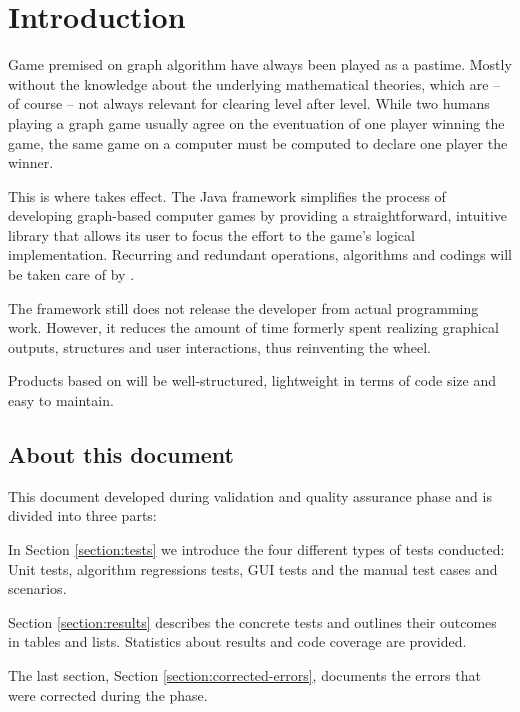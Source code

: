 \section{Introduction}
Game premised on graph algorithm have always been played as a pastime. Mostly without the knowledge about the underlying mathematical theories, which are -- of course -- not always relevant for clearing level after level. While two humans playing a graph game usually agree on the eventuation of one player winning the game, the same game on a computer must be computed to declare one player the winner.\par

This is where \graphioli takes effect. The Java framework simplifies the process of developing graph-based computer games by providing a straightforward, intuitive library that allows its user to focus the effort to the game's logical implementation. Recurring and redundant operations, algorithms and codings will be taken care of by \graphioli.\par

The framework still does not release the developer from actual programming work. However, it reduces the amount of time formerly spent realizing graphical outputs, structures and user interactions, thus reinventing the wheel.\par

Products based on \graphioli will be well-structured, lightweight in terms of code size and easy to maintain.\par

\subsection{About this document}
This document developed during validation and quality assurance phase and is divided into three parts:\par
In Section \ref{section:tests} we introduce the four different types of tests conducted: Unit tests, algorithm regressions tests, GUI tests and the manual test cases and scenarios.\par
Section \ref{section:results} describes the concrete tests and outlines their outcomes in tables and lists. Statistics about results and code coverage are provided.\par
The last section, Section \ref{section:corrected-errors}, documents the errors that were corrected during the phase.\par